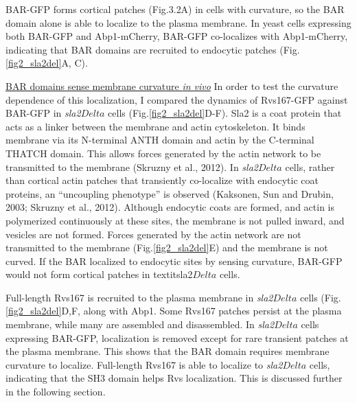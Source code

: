 	\vspace{5mm}
BAR-GFP forms cortical patches (Fig.3.2A) in cells with curvature, so the BAR domain alone is able to localize to the plasma membrane. In yeast cells expressing both BAR-GFP and Abp1-mCherry, BAR-GFP co-localizes with Abp1-mCherry, indicating that BAR domains are recruited to endocytic patches  (Fig.\ref{fig2_sla2del}A, C).  



	\vspace{5mm}
	\underline{BAR domains sense membrane curvature \textit{in vivo}}
In order to test the curvature dependence of this localization, I compared the dynamics of Rvs167-GFP against BAR-GFP in \textit{sla2$Delta$} cells (Fig.\ref{fig2_sla2del}D-F). Sla2 is a coat protein that acts as a linker between the membrane and actin cytoskeleton. It binds membrane via its N-terminal ANTH domain and actin by the C-terminal THATCH domain. This allows forces generated by the actin network to be transmitted to the membrane (Skruzny et al., 2012). In \textit{sla2$Delta$} cells, rather than cortical actin patches that transiently co-localize with endocytic coat proteins, an “uncoupling phenotype” is observed (Kaksonen, Sun and Drubin, 2003; Skruzny et al., 2012). Although endocytic coats are formed, and actin is polymerized continuously at these sites, the membrane is not pulled inward, and vesicles are not formed. Forces generated by the actin network are not transmitted to the membrane (Fig.\ref{fig2_sla2del}E) and the membrane is not curved. If the BAR localized to endocytic sites by sensing curvature, BAR-GFP would not form cortical patches in textit{sla2$Delta$} cells.

	\vspace{5mm}

Full-length Rvs167 is recruited to the plasma membrane in \textit{sla2$Delta$} cells  (Fig.\ref{fig2_sla2del}D,F, along with Abp1. Some Rvs167 patches persist at the plasma membrane, while many are assembled and disassembled. In \textit{sla2$Delta$} cells expressing BAR-GFP, localization is removed except for rare transient patches at the plasma membrane. This shows that the BAR domain requires membrane curvature to localize. Full-length Rvs167 is able to localize to \textit{sla2$Delta$} cells, indicating that the SH3 domain helps Rvs localization. This is discussed further in the following section. 






